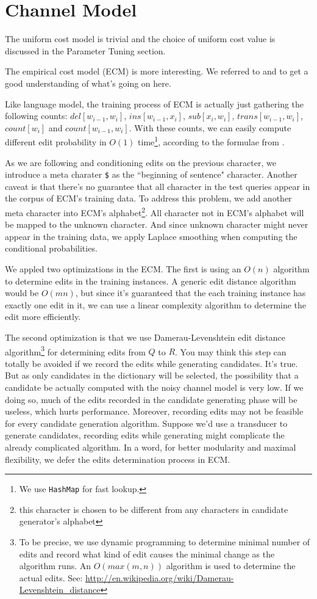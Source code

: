 \documentclass{article}
\begin{document}
\section{Channel Model}

The uniform cost model is trivial and the choice of uniform cost value is discussed in the Parameter Tuning section.

The empirical cost model (ECM) is more interesting. We referred to \cite{jm-book} and \cite{kernighan-1990} to get a good understanding of what's going on here.

Like language model, the training process of ECM is actually just gathering the following counts: $del[w_{i-1},w_i]$, $ins[w_{i-1},x_i]$, $sub[x_i,w_i]$, $trans[w_{i-1},w_i]$, $count[w_i]$ and $count[w_{i-1},w_i]$. With these counts, we can easily compute different edit probability in $O(1)$ time\footnote{We use \texttt{HashMap} for fast lookup.}, according to the formulae from \cite{kernighan-1990}.

As we are following \cite{kernighan-1990} and conditioning edits on the previous character, we introduce a meta charater \texttt{\$} as the ``beginning of sentence" character. Another caveat is that there's no guarantee that all character in the test queries appear in the corpus of ECM's training data. To address this problem, we add another meta character into ECM's alphabet\footnote{this character is chosen to be different from any characters in candidate generator's alphabet}. All character not in ECM's alphabet will be mapped to the unknown character. And since unknown character might never appear in the training data, we apply Laplace smoothing when computing the conditional probabilities.

We appled two optimizations in the ECM. The first is using an $O(n)$ algorithm to determine edits in the training instances. A generic edit distance algorithm would be $O(mn)$, but since it's guaranteed that the each training instance has exactly one edit in it, we can use a linear complexity algorithm to determine the edit more efficiently.

The second optimization is that we use Damerau-Levenshtein edit distance algorithm\footnote{To be precise, we use dynamic programming to determine minimal number of edits and record what kind of edit causes the minimal change as the algorithm runs. An $O(max(m,n))$ algorithm is used to determine the actual edits. See: \url{http://en.wikipedia.org/wiki/Damerau-Levenshtein\_distance}} for determining edits from $Q$ to $R$. You may think this step can totally be avoided if we record the edits while generating candidates. It's true. But as only candidates in the dictionary will be selected, the possibility that a candidate be actually computed with the noisy channel model is very low. If we doing so, much of the edits recorded in the candidate generating phase will be useless, which hurts performance. Moreover, recording edits may not be feasible for every candidate generation algorithm. Suppose we'd use a transducer to generate candidates, recording edits while generating might complicate the already complicated algorithm. In a word, for better modularity and maximal flexibility, we defer the edits determination process in ECM.
\end{document}
